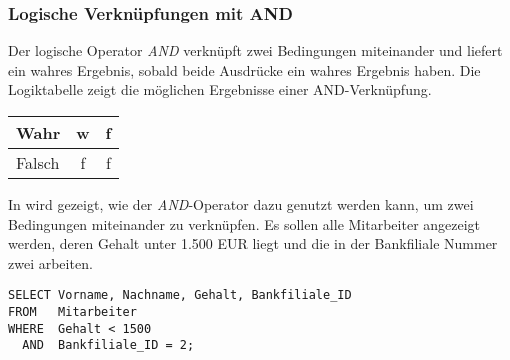        \subsubsection{Logische Verkn\"upfungen mit AND}
          Der logische Operator \textit{AND} verkn\"upft zwei Bedingungen miteinander und liefert ein wahres Ergebnis, sobald beide Ausdr\"ucke ein wahres Ergebnis haben. Die Logiktabelle  zeigt die m\"oglichen Ergebnisse einer AND-Verkn\"upfung.
					\vspace{\baselineskip}
          \begin{center}
            \label{logikand}
            \tablehead{}
            \tabletail{
              \hline
            }
            \tablelasttail{
              \hline
            }
            \begin{supertabular}{|l|c|c|}
              Wahr & w & f \\
              \hline
              Falsch & f & f \\
            \end{supertabular}
          \end{center}
          In  wird gezeigt, wie der \textit{AND}-Operator dazu genutzt werden kann, um zwei Bedingungen miteinander zu verkn\"upfen. Es sollen alle Mitarbeiter angezeigt werden, deren Gehalt unter 1.500 EUR liegt und die in der Bankfiliale Nummer zwei arbeiten.
          \begin{lstlisting}[language=oracle_sql,caption={Der AND Operator},label=sql02_11]
SELECT Vorname, Nachname, Gehalt, Bankfiliale_ID
FROM   Mitarbeiter
WHERE  Gehalt < 1500
  AND  Bankfiliale_ID = 2;
          \end{lstlisting}
